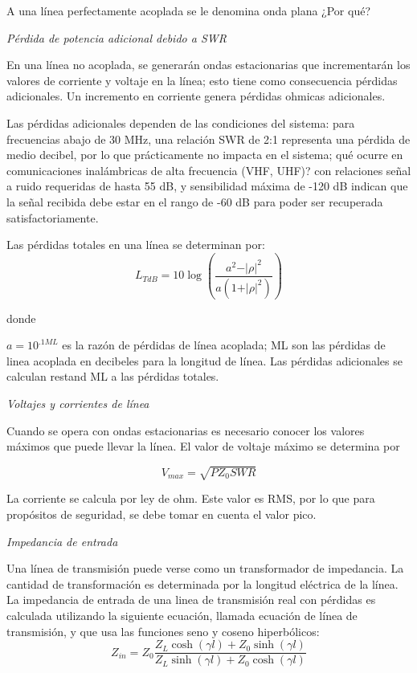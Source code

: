 \documentclass[12pt,letterpaper,titlepage,twoside]{book}
\begin{document}
A una línea perfectamente acoplada se le denomina onda plana ¿Por qué?


\emph{Pérdida de potencia adicional debido a SWR}

En una línea no acoplada, se generarán ondas estacionarias que incrementarán los valores de corriente y voltaje en la línea; esto tiene como consecuencia pérdidas adicionales. Un incremento en corriente genera pérdidas ohmicas adicionales.

Las pérdidas adicionales dependen de las condiciones del sistema: para frecuencias abajo de 30 MHz, una relación SWR de 2:1 representa una pérdida de medio decibel, por lo que prácticamente no impacta en el sistema; qué ocurre en comunicaciones inalámbricas de alta frecuencia (VHF, UHF)? con relaciones señal a ruido requeridas de hasta 55 dB, y sensibilidad máxima de -120 dB indican que la señal recibida debe estar en el rango de -60 dB para poder ser recuperada satisfactoriamente.

Las pérdidas totales en una línea se determinan por:
\begin{equation}
L_{TdB} =10 \log \left( \frac{a^2 - \vert \rho \vert^2}{a\left(1+ \vert \rho \vert^2 \right) }\right)
\end{equation}

donde 

$a = 10^{.1 ML}$ es la razón de pérdidas de línea acoplada; ML son las pérdidas de linea acoplada en decibeles para la longitud de línea. Las pérdidas adicionales se calculan restand ML a las pérdidas totales.

\emph{Voltajes y corrientes de línea}

Cuando se opera con ondas estacionarias es necesario conocer los valores máximos que puede llevar la línea. El valor de voltaje máximo se determina por 

\begin{equation}
 V_{max} = \sqrt{P Z_0 SWR}
 \end{equation} 

La corriente se calcula por ley de ohm. Este valor es RMS, por lo que para propósitos de seguridad, se debe tomar en cuenta el valor pico.

\emph{Impedancia de entrada}

Una línea de transmisión puede verse como un transformador de impedancia. La cantidad de transformación es determinada por la longitud eléctrica de la línea. La impedancia de entrada de una linea de transmisión real con pérdidas es calculada utilizando la siguiente ecuación, llamada ecuación de línea de transmisión, y que usa las funciones seno y coseno hiperbólicos:
\begin{equation}
Z_{in} = Z_0 \frac{Z_L \cosh (\gamma l ) +  Z_0 \sinh (\gamma l )} {Z_L \sinh (\gamma l ) +  Z_0 \cosh (\gamma l )}
\end{equation}
\end{document}

